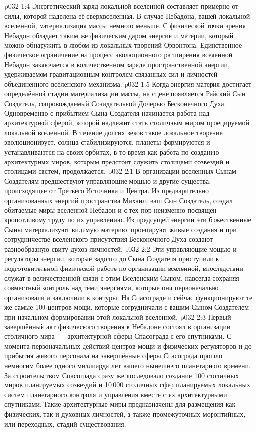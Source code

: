 \vs p032 1:4 Энергетический заряд локальной вселенной составляет примерно  от силы, которой наделена её сверхвселенная. В случае Небадона, вашей локальной вселенной, материализация массы немного меньше. С физической точки зрения Небадон обладает таким же физическим даром энергии и материи, который можно обнаружить в любом из локальных творений Орвонтона. Единственное физическое ограничение на процесс эволюционного расширения вселенной Небадон заключается в количественном заряде пространственной энергии, удерживаемом гравитационным контролем связанных сил и личностей объединённого вселенского механизма.
\vs p032 1:5 \pc Когда энергия\hyp{}материя достигает определённой стадии материализации массы, на сцене появляется Райский Сын Создатель, сопровождаемый Созидательной Дочерью Бесконечного Духа. Одновременно с прибытием Сына Создателя начинается работа над архитектурной сферой, которой надлежит стать столичным миром проецируемой локальной вселенной. В течение долгих веков такое локальное творение эволюционирует, солнца стабилизируются, планеты формируются и устанавливаются на своих орбитах, в то время как работа по созданию архитектурных миров, которым предстоит служить столицами созвездий и столицами систем, продолжается.
\vs p032 2:1 В организации вселенных Сынам Создателям предшествуют управляющие мощью и другие существа, происходящие от Третьего Источника и Центра. Из предварительно организованных энергий пространства Михаил, ваш Сын Создатель, создал обитаемые миры вселенной Небадон и с тех пор неизменно посвящён кропотливому труду по их управлению. Из предсущей энергии эти божественные Сыны материализуют видимую материю, проецируют живые создания и при сотрудничестве вселенского присутствия Бесконечного Духа создают разнообразную свиту духов\hyp{}личностей.
\vs p032 2:2 Эти управляющие мощью и регуляторы энергии, которые задолго до Сына Создателя приступили к подготовительной физической работе по организации вселенной, впоследствии служат в величественной связи с этим Вселенским Сыном, навсегда сохраняя совместный контроль над теми энергиями, которые они первоначально организовали и заключили в контуры. На Спасограде и сейчас функционируют те же самые 100 центров мощи, которые сотрудничали с вашим Сыном Создателем при начальном формировании этой локальной вселенной.
\vs p032 2:3 \pc Первый завершённый акт физического творения в Небадоне состоял в организации столичного мира~--- архитектурной сферы Спасограда с его спутниками. С момента первоначальных действий центров мощи и физических регуляторов и до прибытия живого персонала на завершённые сферы Спасограда прошло немногим более одного миллиарда лет вашего нынешнего планетарного времени. За строительством Спасограда сразу же последовало создание 100 столичных миров планируемых созвездий и 10\,000 столичных сфер планируемых локальных систем планетарного контроля и управления вместе с их архитектурными спутниками. Такие архитектурные миры предназначены для размещения как физических, так и духовных личностей, а также промежуточных моронтийных, или переходных, стадий существования.

